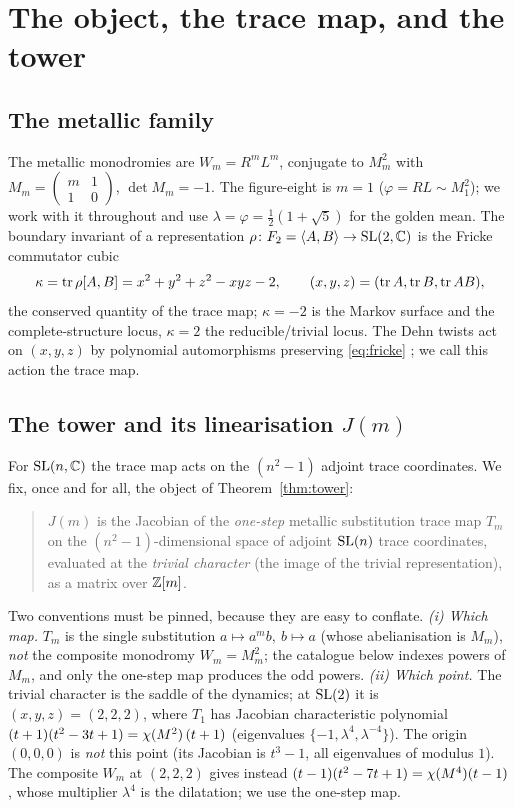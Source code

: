 \section{The object, the trace map, and the tower}
\label{sec:tower}

\subsection{The metallic family} The metallic monodromies are $W_m=R^mL^m$, conjugate to $M_m^2$ with
$M_m=\left(\begin{smallmatrix}m&1\\1&0\end{smallmatrix}\right)$, $\det M_m=-1$. The figure-eight is
$m=1$ ($\varphi=RL\sim M_1^2$); we work with it throughout and use $\lambda=\varphi=\tfrac12(1+\sqrt5)$
for the golden mean. The boundary invariant of a representation $\rho\colon F_2=\langle A,B\rangle\to
\mathrm{SL}(2,\mathbb{C})$ is the Fricke commutator cubic
\begin{equation}\label{eq:fricke}
  \kappa=\operatorname{tr}\rho[A,B]=x^2+y^2+z^2-xyz-2,\qquad (x,y,z)=(\operatorname{tr} A,\operatorname{tr} B,\operatorname{tr} AB),
\end{equation}
the conserved quantity of the trace map; $\kappa=-2$ is the Markov surface and the complete-structure
locus, $\kappa=2$ the reducible/trivial locus. The Dehn twists act on $(x,y,z)$ by polynomial
automorphisms preserving \eqref{eq:fricke} \cite{goldman2009,robertsbaake1994,cantatloray2009}; we call
this action the trace map.

\subsection{The tower and its linearisation $J(m)$}\label{ss:Jdef} For $\mathrm{SL}(n,\mathbb{C})$ the trace map acts on
the $(n^2-1)$ adjoint trace coordinates. We fix, once and for all, the object of Theorem~\ref{thm:tower}:
\begin{quote}
$J(m)$ is the Jacobian of the \emph{one-step} metallic substitution trace map $T_m$ on the
$(n^2-1)$-dimensional space of adjoint $\mathrm{SL}(n)$ trace coordinates, evaluated at the \emph{trivial
character} (the image of the trivial representation), as a matrix over $\mathbb{Z}[m]$.
\end{quote}
Two conventions must be pinned, because they are easy to conflate. \emph{(i) Which map.} $T_m$ is the
single substitution $a\mapsto a^mb,\ b\mapsto a$ (whose abelianisation is $M_m$), \emph{not} the
composite monodromy $W_m=M_m^2$; the catalogue below indexes powers of $M_m$, and only the one-step map
produces the odd powers. \emph{(ii) Which point.} The trivial character is the saddle of the dynamics;
at $\mathrm{SL}(2)$ it is $(x,y,z)=(2,2,2)$, where $T_1$ has Jacobian characteristic polynomial
$(t+1)(t^2-3t+1)=\chi(M^2)\,(t+1)$ (eigenvalues $\{-1,\lambda^4,\lambda^{-4}\}$). The origin $(0,0,0)$
is \emph{not} this point (its Jacobian is $t^3-1$, all eigenvalues of modulus $1$). The composite $W_m$
at $(2,2,2)$ gives instead $(t-1)(t^2-7t+1)=\chi(M^4)(t-1)$, whose multiplier $\lambda^4$ is the
dilatation; we use the one-step map.

